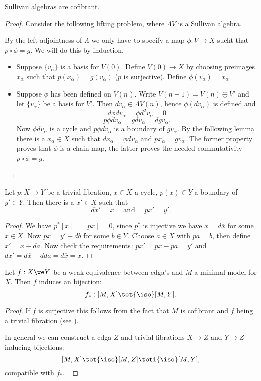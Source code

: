 \begin{lemma}
	Sullivan algebras are cofibrant.
\end{lemma}
\begin{proof}
	Consider the following lifting problem, where $\Lambda V$ is a Sullivan algebra.


	By the left adjointness of $\Lambda$ we only have to specify a map $\phi: V \to X$ sucht that $p \circ \phi = g$. We will do this by induction.
	\begin{itemize}
		\item Suppose $\{v_\alpha\}$ is a basis for $V(0)$. Define $V(0) \to X$ by choosing preimages $x_\alpha$ such that $p(x_\alpha) = g(v_\alpha)$ ($p$ is surjective). Define $\phi(v_\alpha) = x_\alpha$.
		\item Suppose $\phi$ has been defined on $V(n)$. Write $V(n+1) = V(n) \oplus V'$ and let $\{v_\alpha\}$ be a basis for $V'$. Then $dv_\alpha \in \Lambda V(n)$, hence $\phi(dv_\alpha)$ is defined and
		$$ d \phi d v_\alpha = \phi d^2 v_\alpha = 0 $$
		$$ p \phi d v_\alpha = g d v_\alpha = d g v_\alpha. $$
		Now $\phi d v_\alpha$ is a cycle and $p \phi d v_\alpha$ is a boundary of $g v_\alpha$. By the following lemma there is a $x_\alpha \in X$ such that $d x_\alpha = \phi d v_\alpha$ and $p x_\alpha = g v_\alpha$. The former property proves that $\phi$ is a chain map, the latter proves the needed commutativity $p \circ \phi = g$.
	\end{itemize}
\end{proof}

\begin{lemma}
	Let $p: X \to Y$ be a trivial fibration, $x \in X$ a cycle, $p(x) \in Y$ a boundary of $y' \in Y$. Then there is a $x' \in X$ such that
	$$ dx' = x \quad\text{ and }\quad px' = y'. $$
\end{lemma}
\begin{proof}
	We have $p^\ast [x] = [px] = 0$, since $p^\ast$ is injective we have $x = d \overline{x}$ for some $\overline{x} \in X$. Now $p \overline{x} = y' + db$ for some $b \in Y$. Choose $a \in X$ with $p a = b$, then define $x' = \overline{x} - da$. Now check the requirements: $p x' = p \overline{x} - p a = y'$ and $d x' = d \overline{x} - d d a = d \overline{x} = x$.
\end{proof}

\begin{lemma}
	Let $f: X \we Y$ be a weak equivalence between cdga's and $M$ a minimal model for $X$. Then $f$ induces an bijection:
	$$ f_\ast: [M, X] \tot{\iso} [M, Y]. $$
\end{lemma}
\begin{proof}
	If $f$ is surjective this follows from the fact that $M$ is cofibrant and $f$ being a trivial fibration (see \cite[lemma 4.9]{dwyer}).

	In general we can construct a cdga $Z$ and trivial fibrations $X \to Z$ and $Y \to Z$ inducing bijections:
	$$ [M, X] \tot{\iso} [M, Z] \toti{\iso} [M, Y], $$
	compatible with $f_\ast$. \cite[Proposition 12.9]{felix}.
\end{proof}


